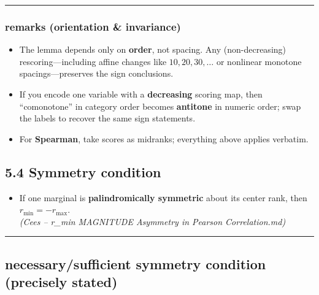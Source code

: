\documentclass[
  letterpaper,
  DIV=11,
  numbers=noendperiod]{scrartcl}
\providecommand{\tightlist}{%
  \setlength{\itemsep}{0pt}\setlength{\parskip}{0pt}}
\theoremstyle{remark}
\begin{document}
\begin{center}\rule{0.5\linewidth}{0.5pt}\end{center}

\subsubsection{remarks (orientation \&
invariance)}\label{remarks-orientation-invariance}

\begin{itemize}
\item
  The lemma depends only on \textbf{order}, not spacing. Any
  (non-decreasing) rescoring---including affine changes like
  \(10,20,30,\dots\) or nonlinear monotone spacings---preserves the sign
  conclusions.
\item
  If you encode one variable with a \textbf{decreasing} scoring map,
  then ``comonotone'' in category order becomes \textbf{antitone} in
  numeric order; swap the labels to recover the same sign statements.
\item
  For \textbf{Spearman}, take scores as midranks; everything above
  applies verbatim.
\end{itemize}

\subsection{5.4 Symmetry condition}\label{symmetry-condition}

\begin{itemize}
\tightlist
\item
  If one marginal is \textbf{palindromically symmetric} about its center
  rank, then \(r_{\min} = -r_{\max}\).\\
  \emph{(Cees -- r\_min MAGNITUDE Asymmetry in Pearson Correlation.md)}
\end{itemize}

\begin{center}\rule{0.5\linewidth}{0.5pt}\end{center}

\subsection{necessary/sufficient symmetry condition (precisely
stated)}\label{necessarysufficient-symmetry-condition-precisely-stated}
\end{document}
